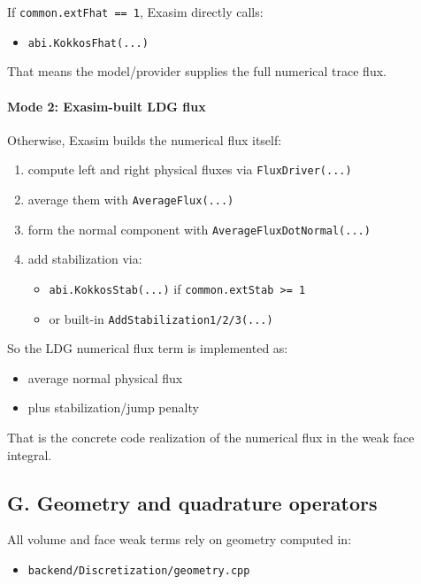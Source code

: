 \documentclass[11pt]{article}
\begin{document}
If \texttt{common.extFhat == 1}, Exasim directly calls:

\begin{itemize}[leftmargin=*]
\item \texttt{abi.KokkosFhat(...)}
\end{itemize}

That means the model/provider supplies the full numerical trace flux.

\paragraph{Mode 2: Exasim-built LDG flux}

Otherwise, Exasim builds the numerical flux itself:

\begin{enumerate}[leftmargin=*]
\item compute left and right physical fluxes via \texttt{FluxDriver(...)}
\item average them with \texttt{AverageFlux(...)}
\item form the normal component with \texttt{AverageFluxDotNormal(...)}
\item add stabilization via:
\begin{itemize}[leftmargin=*]
\item \texttt{abi.KokkosStab(...)} if \texttt{common.extStab >= 1}
\item or built-in \texttt{AddStabilization1/2/3(...)}
\end{itemize}
\end{enumerate}

So the LDG numerical flux term is implemented as:

\begin{itemize}[leftmargin=*]
\item average normal physical flux
\item plus stabilization/jump penalty
\end{itemize}

That is the concrete code realization of the numerical flux in the weak face
integral.

\subsection*{G. Geometry and quadrature operators}

All volume and face weak terms rely on geometry computed in:

\begin{itemize}[leftmargin=*]
\item \texttt{backend/Discretization/geometry.cpp}
\end{itemize}
\end{document}

